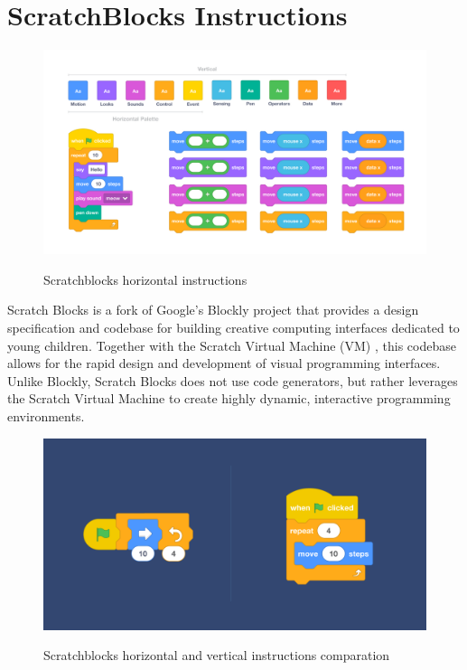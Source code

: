 \documentclass[12 pct]{report}
\begin{document}
\section{ScratchBlocks Instructions}
\begin{figure}[H]
\includegraphics[width=1.0\textwidth]{scratchblocks-2}
\centering
\label{fig:hololens}
\caption{Scratchblocks horizontal instructions}
\end{figure}

Scratch Blocks is a fork of Google's Blockly project that provides a design specification and codebase for building creative computing interfaces dedicated to young children. Together with the Scratch Virtual Machine (VM) \cite{scratchvm} , this codebase allows for the rapid design and development of visual programming interfaces. Unlike Blockly, Scratch Blocks does not use code generators, but rather leverages the Scratch Virtual Machine to create highly dynamic, interactive programming environments.

\begin{figure}[H]
\includegraphics[width=1.0\textwidth]{scratchblocks}
\centering
\label{fig:hololens}
\caption{Scratchblocks horizontal and vertical instructions comparation}
\end{figure}
\end{document}

